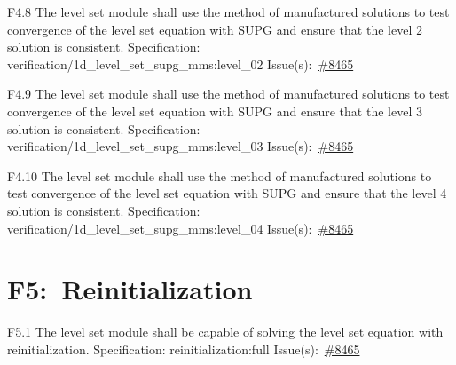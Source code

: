 \begin{Requirement}{F4.8}
The level set module shall use the method of manufactured solutions to test convergence of the level set equation with SUPG and ensure that the level 2 solution is consistent.
\newline
Specification: verification/1d\_level\_set\_supg\_mms:level\_02
\newline
Issue(s):~\href{https://github.com/idaholab/moose/issues/8465}{\#8465}
\end{Requirement}

\begin{Requirement}{F4.9}
The level set module shall use the method of manufactured solutions to test convergence of the level set equation with SUPG and ensure that the level 3 solution is consistent.
\newline
Specification: verification/1d\_level\_set\_supg\_mms:level\_03
\newline
Issue(s):~\href{https://github.com/idaholab/moose/issues/8465}{\#8465}
\end{Requirement}

\begin{Requirement}{F4.10}
The level set module shall use the method of manufactured solutions to test convergence of the level set equation with SUPG and ensure that the level 4 solution is consistent.
\newline
Specification: verification/1d\_level\_set\_supg\_mms:level\_04
\newline
Issue(s):~\href{https://github.com/idaholab/moose/issues/8465}{\#8465}
\end{Requirement}
\section*{F5:~Reinitialization}
\begin{Requirement}{F5.1}
The level set module shall be capable of solving the level set equation with reinitialization.
\newline
Specification: reinitialization:full
\newline
Issue(s):~\href{https://github.com/idaholab/moose/issues/8465}{\#8465}
\end{Requirement}
